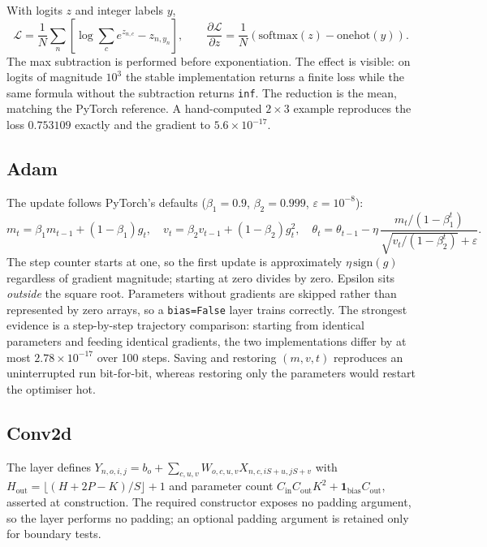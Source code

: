 \documentclass[10pt]{article}
\begin{document}
With logits $z$ and integer labels $y$,
\begin{equation}
\mathcal{L} = \frac{1}{N}\sum_n\left[\log\sum_c e^{z_{n,c}} - z_{n,y_n}\right], \qquad
\frac{\partial\mathcal{L}}{\partial z} = \frac{1}{N}\left(\mathrm{softmax}(z)-\mathrm{onehot}(y)\right).
\end{equation}
The max subtraction is performed before exponentiation. The effect is visible: on logits of magnitude
$10^3$ the stable implementation returns a finite loss while the same formula without the subtraction
returns \texttt{inf}. The reduction is the mean, matching the PyTorch reference. A hand-computed $2\times3$ example
reproduces the loss $0.753109$ exactly and the gradient to $5.6\times10^{-17}$.

\subsection{Adam}

The update follows PyTorch's defaults ($\beta_1=0.9$, $\beta_2=0.999$, $\varepsilon=10^{-8}$):
\begin{equation}
m_t=\beta_1 m_{t-1}+(1-\beta_1)g_t,\quad
v_t=\beta_2 v_{t-1}+(1-\beta_2)g_t^2,\quad
\theta_t=\theta_{t-1}-\eta\,\frac{m_t/(1-\beta_1^t)}{\sqrt{v_t/(1-\beta_2^t)}+\varepsilon}.
\end{equation}
The step counter starts at one, so the first update is approximately $\eta\,\mathrm{sign}(g)$
regardless of gradient magnitude; starting at zero divides by zero. Epsilon sits \emph{outside} the
square root. Parameters without gradients are skipped rather than represented by zero arrays, so a
\texttt{bias=False} layer trains correctly. The strongest evidence is a step-by-step trajectory
comparison: starting from identical parameters and feeding identical gradients, the two
implementations differ by at most $2.78\times10^{-17}$ over 100 steps. Saving and restoring
$(m,v,t)$ reproduces an uninterrupted run bit-for-bit, whereas restoring only the parameters would
restart the optimiser hot.

\subsection{Conv2d}

The layer defines
$Y_{n,o,i,j}=b_o+\sum_{c,u,v}W_{o,c,u,v}X_{n,c,iS+u,jS+v}$ with
$H_{\text{out}}=\lfloor(H+2P-K)/S\rfloor+1$ and parameter count
$C_{\text{in}}C_{\text{out}}K^2+\mathbf{1}_{\mathrm{bias}}C_{\text{out}}$,
asserted at construction. The required constructor exposes no padding argument, so the layer performs no padding; an optional padding argument is retained only for boundary tests.
\end{document}
